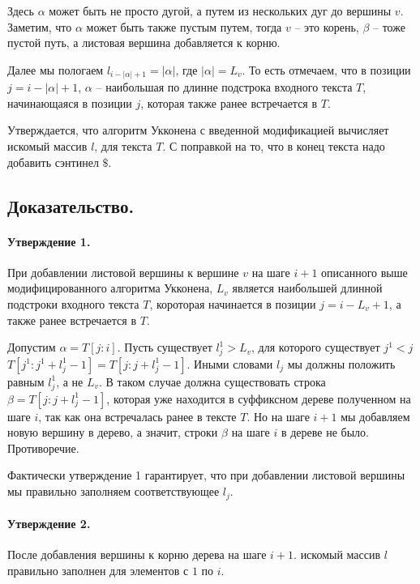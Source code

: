 \documentclass[12pt]{article}
\begin{document}
Здесь $ \alpha $ может быть не просто дугой, а путем из нескольких дуг до
вершины $ v $.  Заметим, что $ \alpha $ может быть также пустым путем, тогда
$ v $ -- это корень, $ \beta $ -- тоже пустой путь, а листовая вершина
добавляется к корню.

Далее мы пологаем $ l_{i - |\alpha| + 1} = |\alpha| $, где $ |\alpha| = L_v $.
То есть отмечаем, что в позиции $ j = i - |\alpha| + 1 $,  $ \alpha $ --
наибольшая по длинне подстрока входного текста $ T $, начинающаяся в
позиции $ j $, которая также ранее встречается в $ T $.

Утверждается, что алгоритм Укконена с введенной модификацией вычисляет
искомый массив $ l $, для текста $ T $. С поправкой на то, что в конец
текста надо добавить сэнтинел $\$$.


\subsection{Доказательство.}
\paragraph{Утверждение 1.} При добавлении листовой вершины к вершине $ v $ на шаге $ i + 1 $
описанного выше модифицированного алгоритма Укконена, $ L_v $ является
наибольшей длинной подстроки входного текста $ T $, короторая начинается в
позиции $ j = i - L_v + 1 $, а также ранее встречается в $ T $.

Допустим $ \alpha = T[j:i] $.
Пусть существует $ l_j^1 > L_v $, для которого существует $ j^1 < j $
$ T[j^1:j^1 + l_j^1 - 1] = T[j:j + l_j^1 - 1] $. Иными словами $ l_j $
мы должны положить равным $ l_j^1 $, а не $ L_v $. В таком случае
должна существовать строка $ \beta = T[j:j + l_j^1 - 1]$, которая уже
находится в суффиксном дереве полученном на шаге $ i $, так как она
встречалась ранее в тексте $ T $.
Но на шаге $ i + 1 $ мы добавляем новую вершину в дерево, а
значит, строки $ \beta $ на шаге $ i $ в дереве не было. Противоречие.


Фактически утверждение 1 гарантирует, что при добавлении листовой
вершины мы правильно заполняем соответствующее $ l_j $.


\paragraph{Утверждение 2.} После добавления вершины к корню дерева на шаге
$ i + 1 $. искомый массив $ l $ правильно заполнен для элементов с
$ 1 $ по $ i $.
\end{document}
